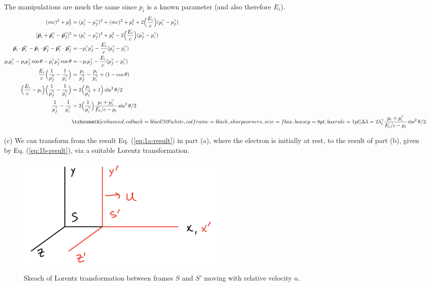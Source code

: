 {The manipulations are much the same since $p_{i}$ is a known parameter (and also therefore $E_{i}$).
\begin{eqnarray}
    \label{eq:1b-result}
    \begin{aligned}
        (mc)^2 + p_{f}^2 &= (p_{i}^{\gamma} - p_{f}^{\gamma})^2 + (mc)^2 + p_{i}^2 + 2 \Big( \frac{E_{i}}{c} \Big) (p_{i}^{\gamma} - p_{f}^{\gamma}) \\
        [\va*{p}_{i} + \va*{p}_{i}^{\gamma} - \va*{p}_{f}^{\gamma}]^2 &= (p_{i}^{\gamma} - p_{f}^{\gamma})^2 + p_{i}^2 - 2 \Big( \frac{E_{i}}{c} \Big) (p_{f}^{\gamma} - p_{i}^{\gamma}) \\
        \va*{p}_{i} \cdot \va*{p}_{i}^{\gamma} - \va*{p}_{i} \cdot \va*{p}_{f}^{\gamma} - \va*{p}_{i}^{\gamma} \cdot \va*{p}_{f}^{\gamma} &= - p_{i}^{\gamma} p_{f}^{\gamma} - \frac{E_{i}}{c} (p_{f}^{\gamma} - p_{i}^{\gamma}) \\
        p_{i} p_{i}^{\gamma} - p_{i} p_{f}^{\gamma} \cos{\theta} - p_{i}^{\gamma} p_{f}^{\gamma} \cos{\theta} &= -p_{i} p_{f}^{\gamma} - \frac{E_{i}}{c} (p_{f}^{\gamma} - p_{i}^{\gamma}) \\
        \frac{E_{i}}{c} \Big( \frac{1}{p_{f}^{\gamma}} - \frac{1}{p_{i}^{\gamma}} \Big) &= \frac{p_{i}}{p_{f}^{\gamma}} - \frac{p_{i}}{p_{i}^{\gamma}} + (1 - \cos{\theta}) \\
        \Big( \frac{E_{i}}{c} - p_{i} \Big) \Big( \frac{1}{p_{f}^{\gamma}} - \frac{1}{p_{i}^{\gamma}} \Big) &= 2 \Big( \frac{p_{i}}{p_{i}^{\gamma}} + 1 \Big) \sin^2{\theta/2} \\
        \frac{1}{p_{f}^{\gamma}} - \frac{1}{p_{i}^{\gamma}} &= 2 \Big( \frac{1}{p_{i}^{\gamma}} \Big) \frac{p_{i} + p_{i}^{\gamma}}{E_{i}/c - p_{i}} \sin^2{\theta/2} \\
                                                            &\eqbox{ \Delta \lambda = 2 \lambda_{i}^{\gamma} \frac{p_{i} + p_{i}^{\gamma}}{E_{i}/c - p_{i}} \sin^2{\theta/2} }
    .\end{aligned}
\end{eqnarray}

(c) We can transform from the result Eq. (\ref{eq:1a-result}) in part (a), where the electron is initially at rest, to the result of part (b), given by Eq. (\ref{eq:1b-result}), via a suitable Lorentz transformation.

\begin{figure}[h!tb]
    \centering
    \includegraphics[width=0.5\textwidth]{prob1c.jpeg}
    \label{fig:prob1c}
    \caption{Skeach of Lorentz transformation between frames $S$ and $S'$ moving with relative velocity $u$.}
\end{figure}

}
